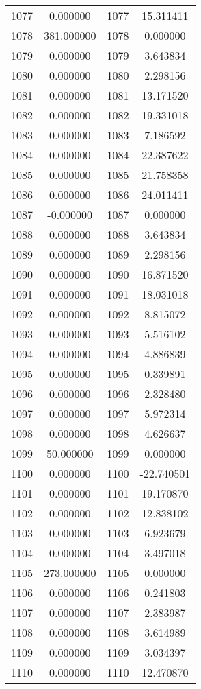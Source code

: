 \documentclass[12pt]{article}
\begin{document}
\begin{longtable}{@{}cccc@{}}
1077 & 0.000000 & 1077 & 15.311411 \\
1078 & 381.000000 & 1078 & 0.000000 \\
1079 & 0.000000 & 1079 & 3.643834 \\
1080 & 0.000000 & 1080 & 2.298156 \\
1081 & 0.000000 & 1081 & 13.171520 \\
1082 & 0.000000 & 1082 & 19.331018 \\
1083 & 0.000000 & 1083 & 7.186592 \\
1084 & 0.000000 & 1084 & 22.387622 \\
1085 & 0.000000 & 1085 & 21.758358 \\
1086 & 0.000000 & 1086 & 24.011411 \\
1087 & -0.000000 & 1087 & 0.000000 \\
1088 & 0.000000 & 1088 & 3.643834 \\
1089 & 0.000000 & 1089 & 2.298156 \\
1090 & 0.000000 & 1090 & 16.871520 \\
1091 & 0.000000 & 1091 & 18.031018 \\
1092 & 0.000000 & 1092 & 8.815072 \\
1093 & 0.000000 & 1093 & 5.516102 \\
1094 & 0.000000 & 1094 & 4.886839 \\
1095 & 0.000000 & 1095 & 0.339891 \\
1096 & 0.000000 & 1096 & 2.328480 \\
1097 & 0.000000 & 1097 & 5.972314 \\
1098 & 0.000000 & 1098 & 4.626637 \\
1099 & 50.000000 & 1099 & 0.000000 \\
1100 & 0.000000 & 1100 & -22.740501 \\
1101 & 0.000000 & 1101 & 19.170870 \\
1102 & 0.000000 & 1102 & 12.838102 \\
1103 & 0.000000 & 1103 & 6.923679 \\
1104 & 0.000000 & 1104 & 3.497018 \\
1105 & 273.000000 & 1105 & 0.000000 \\
1106 & 0.000000 & 1106 & 0.241803 \\
1107 & 0.000000 & 1107 & 2.383987 \\
1108 & 0.000000 & 1108 & 3.614989 \\
1109 & 0.000000 & 1109 & 3.034397 \\
1110 & 0.000000 & 1110 & 12.470870 \\

\end{longtable}
\end{document}
